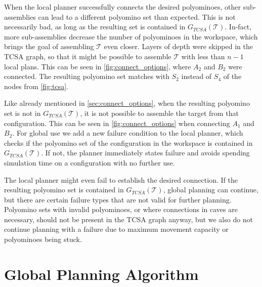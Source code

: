 When the local planner successfully connects the desired polyominoes, other sub-assemblies can lead to a different polyomino set than expected.
This is not necessarily bad, as long as the resulting set is contained in $G_{\textit{TCSA}}(\mathcal{T})$.
In-fact, more sub-assemblies decrease the number of polyominoes in the workspace, which brings the goal of assembling $\mathcal{T}$ even closer.
Layers of depth were skipped in the TCSA graph, so that it might be possible to assemble $\mathcal{T}$ with less than $n-1$ local plans.
This can be seen in \autoref{fig:connect_options}, where $A_2$ and $B_2$ were connected. 
The resulting polyomino set matches with $S_2$ instead of $S_4$ of the nodes from \autoref{fig:tcsa}.

Like already mentioned in \autoref{sec:connect_options}, when the resulting polyomino set is not in $G_{\textit{TCSA}}(\mathcal{T})$, it is not possible to assemble the target from that configuration.
This can be seen in \autoref{fig:connect_options} when connecting $A_1$ and $B_2$.
For global use we add a new failure condition to the local planner, which checks if the polyomino set of the configuration in the workspace is contained in $G_{\textit{TCSA}}(\mathcal{T})$.
If not, the planner immediately states failure and avoids spending simulation time on a configuration with no further use.

The local planner might even fail to establish the desired connection.
If the resulting polyomino set is contained in $G_{\textit{TCSA}}(\mathcal{T})$, global planning can continue, but there are certain failure types that are not valid for further planning.
Polyomino sets with invalid polyominoes, or where connections in caves are necessary, should not be present in the TCSA graph anyway, but we also do not continue planning with a failure due to maximum movement capacity or polyominoes being stuck.

\section{Global Planning Algorithm}
\label{sec:global_algo}

